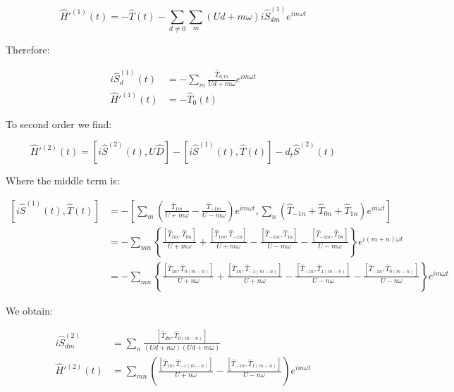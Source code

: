 \begin{equation}
\hat{H}'^{(1)}(t)=-\hat{T}(t)-\sum_{d\neq 0}\sum_m (Ud+m\omega) i\hat{S}^{(1)}_{dm} e^{im\omega t}
\end{equation}

Therefore:

\begin{align*}
i\hat{S}^{(1)}_d(t) &= -\sum_m \frac{\hat{T}_{d,m}}{Ud+m\omega}e^{im\omega t} \\
\hat{H}'^{(1)}(t) &= -\hat{T}_0(t)
\end{align*}

To second order we find:

\begin{equation}
\hat{H}'^{(2)}(t) = \left[i\hat{S}^{(2)}(t), U \hat{D} \right] - \left[ i\hat{S}^{(1)}(t), \hat{T}(t) \right] - d_t\hat{S}^{(2)}(t)
\end{equation}

Where the middle term is:

\begin{align*}
\left[ i\hat{S}^{(1)}(t), \hat{T}(t) \right] &= -\left[\sum_m \left( \frac{\hat{T}_{1m}}{U+m\omega} - \frac{\hat{T}_{-1m}}{U-m\omega} \right)e^{im \omega t}, \sum_n \left( \hat{T}_{-1n} +\hat{T}_{0n} + \hat{T}_{1n} \right) e^{in\omega t} \right] \\
&= -\sum_{mn} \left\{ \frac{\left[\hat{T}_{1m}, \hat{T}_{0n} \right]}{U+m\omega} + \frac{\left[\hat{T}_{1m}, \hat{T}_{-1n} \right]}{U+m\omega} - \frac{\left[\hat{T}_{-1m}, \hat{T}_{1n} \right]}{U-m\omega} - \frac{\left[\hat{T}_{-1m}, \hat{T}_{0n} \right]}{U-m\omega} \right\} e^{i(m+n)\omega t} \\
&= -\sum_{mn} \left\{ \frac{\left[\hat{T}_{1n}, \hat{T}_{0(m-n)} \right]}{U+n\omega} + \frac{\left[\hat{T}_{1n}, \hat{T}_{-1(m-n)} \right]}{U+n\omega} - \frac{\left[\hat{T}_{-1n}, \hat{T}_{1(m-n)} \right]}{U-n\omega} - \frac{\left[\hat{T}_{-1n}, \hat{T}_{0(m-n)} \right]}{U-n\omega} \right\} e^{im\omega t}
\end{align*}

We obtain:

\begin{align*}
i\hat{S}^{(2)}_{dm} &= \sum_n \frac{\left[ \hat{T}_{dn}, \hat{T}_{0(m-n)} \right]}{(Ud+n\omega)(Ud+m\omega)} \\
\hat{H}'^{(2)}(t) &= \sum_{mn} \left( \frac{\left[\hat{T}_{1n}, \hat{T}_{-1(m-n)} \right]}{U+n\omega} - \frac{\left[\hat{T}_{-1n}, \hat{T}_{1(m-n)} \right]}{U-n\omega} \right) e^{im\omega t}
\end{align*}

